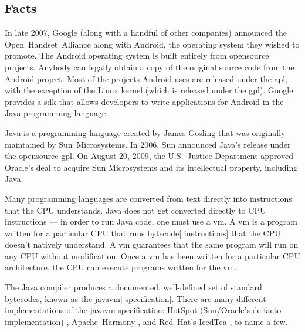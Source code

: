 \documentclass[11pt]{article}
\begin{document}
\begin{multicols}{2}

\section{Facts} %
\label{sec:facts}

In late 2007, Google (along with a handful of other companies) announced the
Open~Handset~Alliance \cite{open-handset-alliance-ann} along with Android, the
operating system they wished to promote.  The Android operating system is built
entirely from \gls{opensource} projects.  Anybody can legally obtain a copy of
the original source code from the Android project.  Most of the projects Android
uses are released under the \gls{apl}, with the exception of the Linux kernel
(which is released under the \gls{gpl}).  Google provides a \gls{sdk} that
allows developers to write applications for Android in the Java programming
language.

Java is a programming language created by James Gosling that was originally
maintained by Sun~Microsystems.  In 2006, Sun announced Java's release under the
\gls{opensource} \gls{gpl}. \cite{sun-open-sources-java} On August 20, 2009, the
U.S.~Justice Department approved Oracle's deal to acquire Sun Microsystems and
its intellectual property, including Java. \cite{oracle-buys-sun}

Many programming languages are converted from text directly into instructions
that the CPU understands.  Java does not get converted directly to CPU
instructions --- in order to run Java code, one must use a \gls{vm}.  A \gls{vm}
is a program written for a particular CPU that runs \gls{bytecode}[
instructions] that the CPU doesn't natively understand.  A \gls{vm} guarantees
that the same program will run on any CPU without modification.  Once a \gls{vm}
has been written for a particular CPU architecture, the CPU can execute programs
written for the \gls{vm}.

The Java compiler produces a documented, well-defined set of standard
\glspl{bytecode}, known as the \gls{javavm}[ specification]. \cite[Chapter
4]{javavm-bytecode}  There are many different implementations of the
\gls{javavm} specification: HotSpot (Sun/Oracle's de facto implementation)
\cite{hotspot}, Apache~Harmony \cite{apache-harmony}, and Red~Hat's IcedTea
\cite{icedtea}, to name a few.


\end{multicols}
\end{document}
